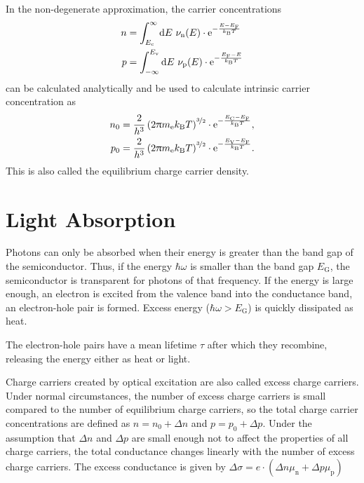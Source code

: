 In the non-degenerate approximation, the carrier concentrations
\begin{align*}
	n &= \int_{E_\text{c}}^\infty\d E\ \nu_\text{n}(E)\cdot\e^{-\frac{E-E_\text{F}}{k_\text{B}T}} \\
	p &= \int_{-\infty}^{E_\text{v}}\d E\ \nu_\text{p}(E)\cdot\e^{-\frac{E_\text{F}-E}{k_\text{B}T}}
\end{align*}
can be calculated analytically and be used to calculate intrinsic carrier concentration as
\begin{alignat*}{1}
	n_0 &= \frac{2}{h^3}	\left(2 \uppi m_\text{e} k_\text{B} T \right)^{\nicefrac{3}{2}} \cdot	\mathrm{e}^{-\frac{E_\text{C} - E_\text{F}}{k_\text{B}T}},\\
	p_0 &= \frac{2}{h^3}	\left(2 \uppi m_\text{e} k_\text{B} T \right)^{\nicefrac{3}{2}} \cdot	\mathrm{e}^{-\frac{E_\text{V} - E_\text{F}}{k_\text{B}T}}.
\end{alignat*}
This is also called the equilibrium charge carrier density.

\section{Light Absorption}\label{sec:theory:absorption}
Photons can only be absorbed when their energy is greater than the band gap of the semiconductor.
Thus, if the energy $\hbar \omega$ is smaller than the band gap $E_\text{G}$, the semiconductor is transparent for photons of that frequency.
If the energy is large enough, an electron is excited from the valence band into the conductance band, an electron-hole pair is formed.
Excess energy ($\hbar \omega > E_\text{G}$) is quickly dissipated as heat.

The electron-hole pairs have a mean lifetime $\tau$ after which they recombine, releasing the energy either as heat or light.

Charge carriers created by optical excitation are also called excess charge carriers.
Under normal circumstances, the number of excess charge carriers is small compared to the number of equilibrium charge carriers, so the total charge carrier concentrations are defined as $n = n_0 + \Delta n$ and $p = p_0 + \Delta p$.
Under the assumption that $\Delta n$ and $\Delta p$ are small enough not to affect the properties of all charge carriers, the total conductance changes linearly with the number of excess charge carriers.
The excess conductance is given by $\Delta \sigma = e \cdot \left( \Delta n \mu_\text{n} + \Delta p \mu_\text{p} \right)$

